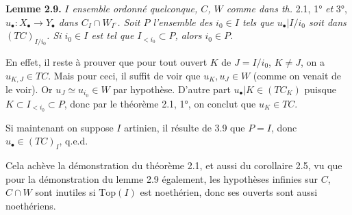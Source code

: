\documentclass[11pt]{article}
\newcommand{\msp}[1]{\marginpar{\footnotesize [#1]}}
\begin{document}
\msp{37}

\noindent\textbf{Lemme 2.9.} \textit{$I$ ensemble ordonné quelconque, $C$, $W$ comme dans th.} 2.1, 1° \textit{et} 3°, \textit{$u_\bullet : X_\bullet \longrightarrow Y_\bullet$ dans $C_I \cap W_{I^\circ}$. Soit $P$ l'ensemble des $i_0 \in I$ tels que $u_\bullet|I/i_0$ soit dans $(TC)_{I/i_0}$. Si $i_0 \in I$ est tel que $I_{<i_0} \subset P$, alors $i_0 \in P$.}

En effet, il reste à prouver que pour tout ouvert $K$ de $J = I/i_0$, $K \neq J$, on a $u_{K,J} \in TC$. Mais pour ceci, il suffit de voir que $u_K, u_J \in W$ (comme on venait de le voir). Or $u_J \simeq u_{i_0} \in W$ par hypothèse. D'autre part $u_\bullet|K \in (TC_K)$ puisque $K \subset I_{<i_0} \subset P$, donc par le théorème 2.1, 1°, on conclut que $u_K \in TC$.

Si maintenant on suppose $I$ artinien, il résulte de 3.9 que $P = I$, donc $u_\bullet \in (TC)_I$, q.e.d. %

Cela achève la démonstration du théorème 2.1, et aussi du corollaire 2.5, vu que pour la démonstration du lemme 2.9 également, les hypothèses infinies sur $C$, $C \cap W$ sont inutiles si $\mathrm{Top}(I)$ est noethérien, donc ses ouverts sont aussi noethériens.
\end{document}
